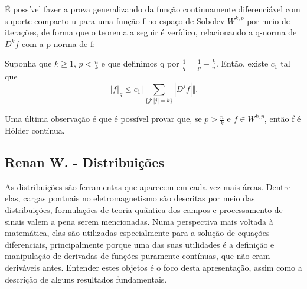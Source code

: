 \documentclass[measure_theory.tex]{subfiles}
\begin{document}
É possível fazer a prova generalizando da função continuamente diferenciável com suporte compacto u para uma função f no espaço de Sobolev \(W^{k, p}\) por meio de iterações, de forma que o teorema a seguir é verídico, relacionando a q-norma de \(D^{k}f\) com a p norma de f:
\begin{theorem*}
	Suponha que \(k\geq 1\), \(p<\frac{n}{k}\) e que definimos q por \(\frac{1}{q}=\frac{1}{p}-\frac{k}{n}.\) Então, existe \(c_{1}\) tal que
	\[
		\Vert f \Vert_{q}\leq c_{1} \biggl\Vert \sum\limits_{\{j: |j|=k\}}^{}|D^{j}f| \biggr\Vert .
	\]
\end{theorem*}
Uma última observação é que é possível provar que, se \(p>\frac{n}{k}\) e \(f\in W^{k, p}\), então f é Hölder contínua.

\subsection{Renan W. - Distribuições}
As distribuições são ferramentas que aparecem em cada vez mais áreas. Dentre elas, cargas pontuais no eletromagnetismo são descritas por meio das distribuições,
formulações de teoria quântica dos campos e processamento de sinais valem a pena serem mencionadas. Numa perspectiva mais voltada à matemática, elas são utilizadas especialmente
para a solução de equações diferenciais, principalmente porque uma das suas utilidades é a definição e manipulação de derivadas de funções puramente contínuas, que não eram deriváveis antes.
Entender estes objetos é o foco desta apresentação, assim como a descrição de alguns resultados fundamentais.
\end{document}
